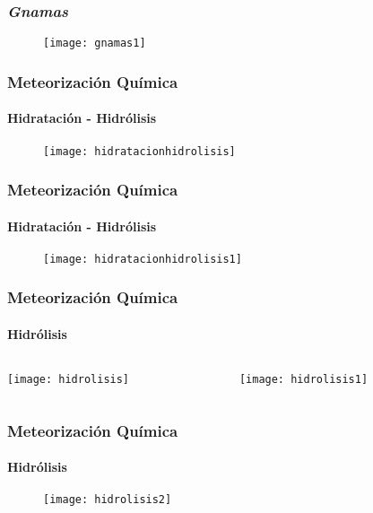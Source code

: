 \documentclass{beamer}
\begin{document}
\begin{frame}
\frametitle{\emph{Gnamas}}
\begin{figure}
\begin{center}
   	\texttt{[image: gnamas1]}
\end{center}
\end{figure}
\end{frame}
\begin{frame}
\frametitle{Meteorización Química}
\framesubtitle{Hidratación - Hidrólisis}
\begin{figure}
\begin{center}
   	\texttt{[image: hidratacionhidrolisis]}
\end{center}
\end{figure}
\end{frame}
\begin{frame}
\frametitle{Meteorización Química}
\framesubtitle{Hidratación - Hidrólisis}
\begin{figure}
\begin{center}
   	\texttt{[image: hidratacionhidrolisis1]}
\end{center}
\end{figure}
\end{frame}
\begin{frame}
\frametitle{Meteorización Química}
\framesubtitle{Hidrólisis}
\begin{columns}
\begin{column}{.5\linewidth}
\begin{center}
\texttt{[image: hidrolisis]}
\end{center}
\end{column}
\begin{column}{.5\linewidth}
\begin{center}
\texttt{[image: hidrolisis1]}
\end{center}
\end{column}
\end{columns}
\end{frame}
\begin{frame}
\frametitle{Meteorización Química}
\framesubtitle{Hidrólisis}
\begin{figure}
\begin{center}
   	\texttt{[image: hidrolisis2]}
\end{center}
\end{figure}
\end{frame}
\end{document}
